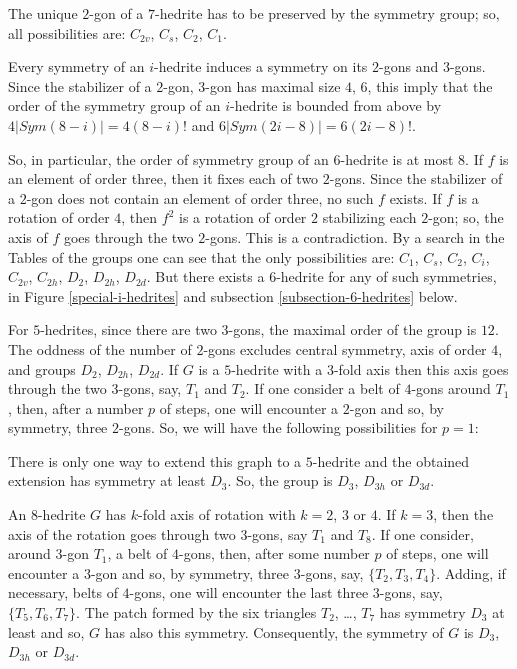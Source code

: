 \documentclass[12pt]{article}
\begin{document}
The unique $2$-gon of a $7$-hedrite has to be preserved by the symmetry
group; so, all possibilities are: $C_{2v}$, $C_s$, $C_2$, $C_1$.

Every symmetry of an $i$-hedrite induces a symmetry on its $2$-gons and $3$-gons. Since the stabilizer of a $2$-gon, $3$-gon has maximal size $4$, $6$, this imply that the order of the symmetry group of an $i$-hedrite is bounded from above by $4|Sym(8-i)|=4(8-i)!$ and $6|Sym(2i-8)|=6(2i-8)!$.

So, in particular, the order of symmetry group of an $6$-hedrite is at
most $8$. If $f$ is an element of order three, then it fixes each of two
$2$-gons. Since the stabilizer of a $2$-gon does not contain an element
of order three, no such $f$ exists. If $f$ is a rotation of
order $4$, then $f^2$ is a rotation of order $2$ stabilizing each $2$-gon;
so, the axis of $f$ goes through the two $2$-gons. This is a contradiction.
By a search in the Tables of the groups one can see that the only possibilities are: $C_1$, $C_s$, $C_2$, $C_i$, $C_{2v}$, $C_{2h}$, $D_2$, $D_{2h}$, $D_{2d}$. But there exists a $6$-hedrite for any of such symmetries, in Figure \ref{special-i-hedrites} and subsection \ref{subsection-6-hedrites} below.

For $5$-hedrites, since there are two $3$-gons, the maximal order of the group is $12$. The oddness of the number of $2$-gons excludes central symmetry, axis of order $4$, and groups $D_2$, $D_{2h}$, $D_{2d}$.
If $G$ is a $5$-hedrite with a $3$-fold axis then this axis goes through
the two $3$-gons, say, $T_1$ and $T_2$. If one consider a belt of $4$-gons
around $T_1$, then, after a number $p$ of steps, one will encounter a
$2$-gon and so, by symmetry, three $2$-gons. So, we will have the 
following possibilities for $p=1$:

\begin{center}
\epsfxsize=90mm
\end{center}

There is only one way to extend this graph to a $5$-hedrite and the obtained extension has symmetry at least $D_3$. So, the group is $D_{3}$, $D_{3h}$ or $D_{3d}$.

An $8$-hedrite $G$ has $k$-fold axis of rotation with $k=2$, $3$ or $4$. 
If $k=3$, then the axis of the rotation goes through two $3$-gons,
say $T_1$ and $T_8$. If one consider, around $3$-gon $T_1$, a belt of 
$4$-gons, then, after some number $p$ of steps, one will encounter a 
$3$-gon and so, by symmetry, three $3$-gons, say, $\{T_2,T_3,T_4\}$. 
Adding, if necessary, belts of $4$-gons, one will encounter the last 
three $3$-gons, say, $\{T_5,T_6,T_7\}$. The patch formed by the six
triangles $T_2$, \dots, $T_7$ has symmetry $D_3$ at least and so, 
$G$ has also this symmetry. Consequently, the symmetry of $G$ is $D_3$,
$D_{3h}$ or $D_{3d}$.
\end{document}
